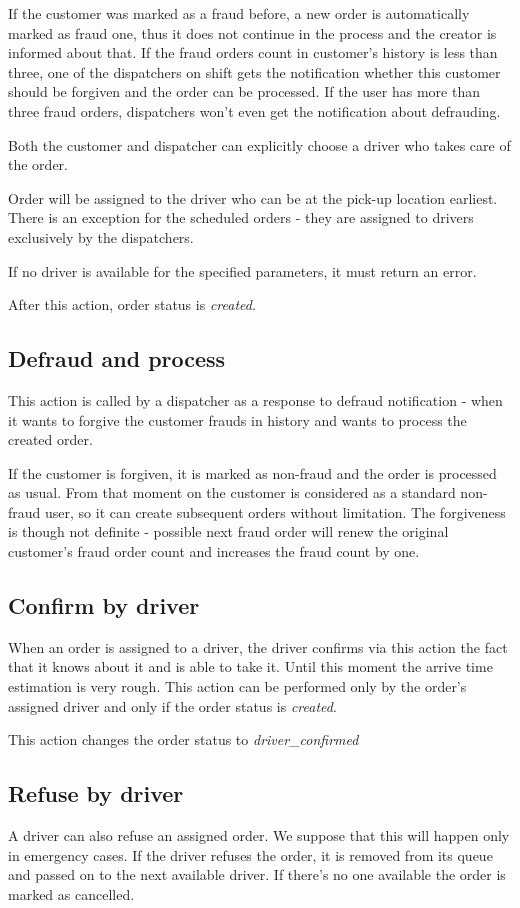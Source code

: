 			If the customer was marked as a fraud before, a new order is automatically marked as fraud one, thus it does not continue in the process and the creator is informed about that. If the fraud orders count in customer's history is less than three, one of the dispatchers on shift gets the notification whether this customer should be forgiven and the order can be processed. If the user has more than three fraud orders, dispatchers won't even get the notification about defrauding.
			
			Both the customer and dispatcher can explicitly choose a driver who takes care of the order. 
			
			Order will be assigned to the driver who can be at the pick-up location earliest. There is an exception for the scheduled orders - they are assigned to drivers exclusively by the dispatchers.
			
			If no driver is available for the specified parameters, it must return an error.
			
			After this action, order status is \textit{created}.
		\subsection{Defraud and process}
			This action is called by a dispatcher as a response to defraud notification - when it wants to forgive the customer frauds in history and wants to process the created order.
			
			If the customer is forgiven, it is marked as non-fraud and the order is processed as usual. From that moment on the customer is considered as a standard non-fraud user, so it can create subsequent orders without limitation. The forgiveness is though not definite - possible next fraud order will renew the original customer's fraud order count and increases the fraud count by one.
		\subsection{Confirm by driver}
			When an order is assigned to a driver, the driver confirms via this action the fact that it knows about it and is able to take it. Until this moment the arrive time estimation is very rough. This action can be performed only by the order's assigned driver and only if the order status is \textit{created}.
			
			This action changes the order status to \textit{driver\_confirmed}
		\subsection{Refuse by driver}
			A driver can also refuse an assigned order. We suppose that this will happen only in emergency cases. If the driver refuses the order, it is removed from its queue and passed on to the next available driver. If there's no one available the order is marked as cancelled.
			
